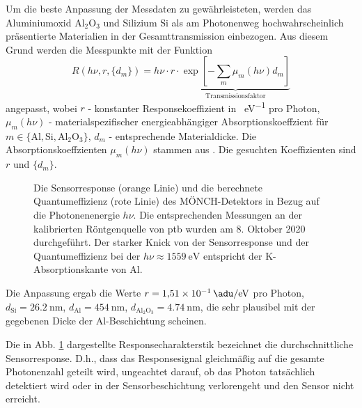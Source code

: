 \noindent
Um die beste Anpassung der Messdaten zu gewährleisteten, werden das Aluminiumoxid Al$_2$O$_3$ und Silizium Si als am Photonenweg hochwahrscheinlich präsentierte Materialien in der Gesamttransmission einbezogen. Aus diesem Grund werden die Messpunkte mit der Funktion
\begin{equation}
    R(h\nu, r, \{d_m\}) = h\nu\cdot r\cdot\underbrace{\exp\left[-\sum_{m}\mu_m(h\nu)d_m\right]}_{\text{Transmissionsfaktor}}
\label{eq:response_durchschnitt}
\end{equation}
angepasst, wobei $r$ - konstanter Responsekoeffizient in \si{\adu\per\eV} pro Photon, $\mu_m(h\nu)$ - materialspezifischer energieabhängiger Absorptionskoeffzient für $m \in \{\text{Al}, \text{Si}, \text{Al$_2$O$_3$}\}$,  $d_m$ - entsprechende Materialdicke. Die Absorptionskoeffzienten $\mu_m(h\nu)$ stammen aus \cite{xray-coeffs}. Die gesuchten Koeffizienten sind $r$ und $\{d_m\}$.
\begin{figure}[H]
    \centering
    
    \caption{Die Sensorresponse (orange Linie) und die berechnete Quantumeffizienz (rote Linie) des MÖNCH-Detektors in Bezug auf die Photonenenergie $h\nu$. Die entsprechenden Messungen an der kalibrierten Röntgenquelle von \gls{ptb} wurden am 8. Oktober 2020 durchgeführt. Der starker Knick von der Sensorresponse und der Quantumeffizienz bei der $h\nu \approx \SI{1559}{\eV}$ entspricht der K-Absorptionskante von Al.}
    \label{fig:response_moench}
\end{figure}
\noindent
Die Anpassung ergab die Werte
$r = \SI{1.51e-1}{\adu\per\eV}$ pro Photon, $d_\text{Si} = \SI{26.2}{\nano\meter}$, $d_\text{Al} = \SI{454}{\nano\meter}$,
$d_\text{Al$_2$O$_3$} = \SI{4.74}{\nano\meter}$, die sehr plausibel mit der gegebenen Dicke der Al-Beschichtung scheinen.

\noindent
Die in Abb. \ref{fig:response_moench} dargestellte Responsecharakterstik bezeichnet die durchschnittliche Sensorresponse. D.h., dass das Responsesignal gleichmäßig auf die gesamte Photonenzahl geteilt wird, ungeachtet darauf, ob das Photon tatsächlich detektiert wird oder in der Sensorbeschichtung verlorengeht und den Sensor nicht erreicht.

